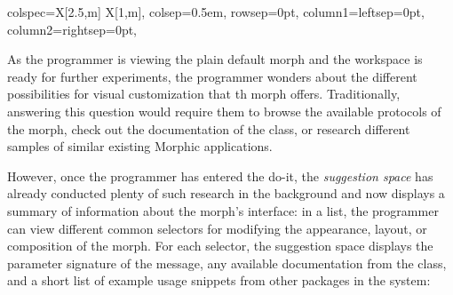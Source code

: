 \begin{center}
\begin{tblr}{
		colspec={X[2.5,m] X[1,m]},
		colsep=0.5em,
		rowsep=0pt,
		column{1}={leftsep=0pt},
		column{2}={rightsep=0pt},
	}
	\end{tblr}
\end{center}

As the programmer is viewing the plain default morph and the workspace is ready for further experiments, the programmer wonders about the different possibilities for visual customization that th morph offers.
Traditionally, answering this question would require them to browse the available protocols of the morph, check out the documentation of the class, or research different samples of similar existing Morphic applications.

However, once the programmer has entered the do-it, the \emph{suggestion space} has already conducted plenty of such research in the background and now displays a summary of information about the morph's interface:
in a list, the programmer can view different common selectors for modifying the appearance, layout, or composition of the morph.
For each selector, the suggestion space displays the parameter signature of the message, any available documentation from the  class, and a short list of example usage snippets from other packages in the system:

